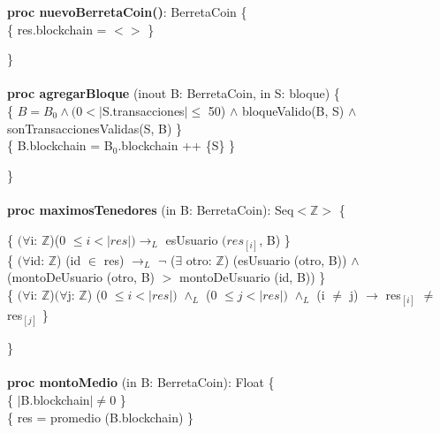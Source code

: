 \documentclass{article}
\newcommand{\Entero}{$\mathds{Z}$}
\begin{document}
        {\selectfont\textbf{proc nuevoBerretaCoin()}: BerretaCoin} \{\\
        \indent{} \{ res.blockchain = $<>$ \}

    \}\\\\

    {\selectfont\textbf{proc agregarBloque} (inout B: BerretaCoin, in S: bloque)} \{\\
        \indent{} \{ $B = B_0 \land (0 < |$S.transacciones$| \leq$ 50) $\land$ bloqueValido(B, S) $\land$ sonTransaccionesValidas(S, B) \}\\
        \indent{} \{ B.blockchain = B${_0}$.blockchain ++ \{S\} \}

    \}\\\\

    {\selectfont\textbf{proc maximosTenedores} (in B: BerretaCoin): Seq$<$\Entero$>$} \{

        \indent{} \{ $(\forall$i: \Entero)(0 $\le i < |res|) \rightarrow_{L}$
                                            esUsuario $(res_{[i]}$, B) \}\\
        \indent{} \{ $(\forall$id: \Entero) (id $\in$ res) $\rightarrow_{L}$
                                         $\neg$ ($\exists$ otro: \Entero) (esUsuario (otro, B)) $\land$\\
        \indent\indent\indent\indent\indent (montoDeUsuario (otro, B) $>$ montoDeUsuario (id, B)) \}\\
        \indent{} \{ $(\forall$i: \Entero)$(\forall$j: \Entero) (0 $\le i < |res|)$ $\land_{L}$ (0 $\le j < |res|)$ $\land_{L}$ (i $\ne$ j) $\rightarrow$ res$_{[i]}$ $\ne$ res$_{[j]}$ \}

    \}\\\\

    {\selectfont\textbf{proc montoMedio} (in B: BerretaCoin): Float} \{\\
        \indent{} \{ $|$B.blockchain$| \ne 0$ \}\\
        \indent{} \{ res = promedio (B.blockchain) \}
\end{document}

